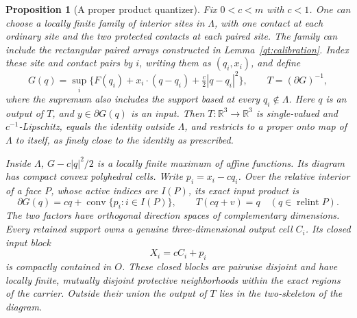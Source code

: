 \documentclass[11pt]{article}
\numberwithin{equation}{section}
\newtheorem{proposition}[theorem]{Proposition}
\theoremstyle{definition}
\theoremstyle{remark}
\newcommand{\R}{\mathbb R}
\DeclareMathOperator{\conv}{conv}
\DeclareMathOperator{\relint}{relint}
\begin{document}
\begin{proposition}[A proper product quantizer]\label{qt:quantizer}
Fix $0<c<m$ with $c<1$.  One can choose a locally finite family of
interior sites in $\Lambda$, with one contact at each ordinary site
and the two protected contacts at each paired site.  The family can
include the rectangular paired arrays constructed in
Lemma~\ref{qt:calibration}.  Index these site and contact pairs by
$i$, writing them as $(q_i,x_i)$, and define
\begin{equation}\label{qt:obstacle}
 G(q)=\sup_i\{F(q_i)+x_i\cdot(q-q_i)+\tfrac c2|q-q_i|^2\},
 \qquad T=(\partial G)^{-1},
\end{equation}
where the supremum also includes the support based at every
$q_i\notin\Lambda$.  Here $q$ is an output of $T$, and
$y\in\partial G(q)$ is an input.  Then $T:\R^3\to\R^3$ is single-valued and
$c^{-1}$-Lipschitz, equals the identity outside $\Lambda$, and restricts
to a proper onto map of $\Lambda$ to itself, as finely close to the
identity as prescribed.

Inside $\Lambda$, $G-c|q|^2/2$ is a locally finite maximum of affine
functions.  Its diagram has compact convex polyhedral cells.  Write
$p_i=x_i-cq_i$.  Over the relative interior of a face $P$, whose active
indices are $I(P)$, its exact input product is
\begin{equation}\label{qt:product}
 \partial G(q)=cq+\conv\{p_i:i\in I(P)\},\qquad
 T(cq+v)=q\quad(q\in\relint P).
\end{equation}
The two factors have orthogonal direction spaces of complementary
dimensions.  Every retained support owns a genuine three-dimensional
output cell $C_i$.  Its closed input block
\begin{equation}\label{qt:blocks}
 X_i=cC_i+p_i
\end{equation}
is compactly contained in $O$.  These closed blocks are pairwise
disjoint and have locally finite, mutually disjoint protective
neighborhoods within the exact regions of the carrier.  Outside their
union the output of $T$ lies in the two-skeleton of the diagram.
\end{proposition}
\end{document}
